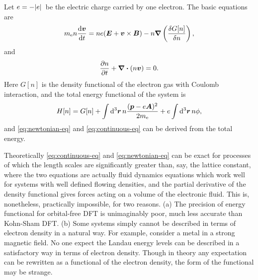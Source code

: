 \documentclass[hyperref, a4paper]{article}
\begin{document}
Let $e = - \abs*{e}$ be the electric charge carried by one electron. The basic equations are 
\begin{equation}
    m_\text{e} n \dv{\vb*{v}}{t} = n e (\vb*{E} + \vb*{v} \times \vb*{B}) - n \grad \left(\fdv{G[n]}{n}\right),
    \label{eq:newtonian-eq}
\end{equation}
and 
\begin{equation}
    \pdv{n}{t} + \div{(n \vb*{v})} = 0.
    \label{eq:continuous-eq}
\end{equation}
Here $G[n]$ is the density functional of the electron gas with Coulomb interaction, and the total energy functional of the system is 
\begin{equation}
    H[n] = G[n] + \int \dd[3]{\vb*{r}} n \frac{(\vb*{p} - e \vb*{A})^2}{2m_\text{e}} + e \int \dd[3]{\vb*{r}} n \phi,
\end{equation}
and \eqref{eq:newtonian-eq} and \eqref{eq:continuous-eq} can be derived from the total energy.

Theoretically \eqref{eq:continuous-eq} and \eqref{eq:newtonian-eq} can be exact for processes of which the length scales are significantly greater than, say, the lattice constant, where the two equations are actually fluid dynamics equations which work well for systems with well defined flowing densities, and the partial derivative of the density functional gives forces acting on a volume of the electronic fluid.
This is, nonetheless, practically impossible, for two reasons.
(a) The precision of energy functional for orbital-free DFT is unimaginably poor, much less accurate than Kohn-Sham DFT.
(b) Some systems simply cannot be described in terms of electron density in a natural way. For example, consider a metal in a strong magnetic field. No one expect the Landau energy levels can be described in a satisfactory way in terms of electron density. Though in theory any expectation can be rewritten as a functional of the electron density, the form of the functional may be strange.
\end{document}
